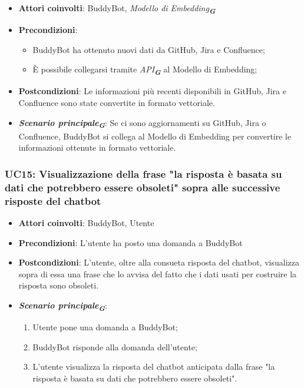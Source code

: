 \begin{itemize}
    \item \textbf{Attori coinvolti}: BuddyBot, \emph{Modello di Embedding}\textsubscript{\textbf{\textit{G}}}
    \item \textbf{Precondizioni}: 
    \begin{itemize}
        \item BuddyBot ha ottenuto nuovi dati da GitHub, Jira e Confluence;
        \item È possibile collegarsi tramite \emph{API}\textsubscript{\textbf{\textit{G}}} al Modello di Embedding;
    \end{itemize}
    \item \textbf{Postcondizioni}: Le informazioni più recenti disponibili in GitHub, Jira e Confluence sono state convertite in formato vettoriale.
    \item \textbf{\emph{Scenario principale}\textsubscript{\textbf{\textit{G}}}}: Se ci sono aggiornamenti su GitHub, Jira o Confluence, BuddyBot si collega al Modello di Embedding per convertire le informazioni 
        ottenute in formato vettoriale.
\end{itemize}



\hypertarget{UC15}{}
\subsubsection{UC15: Visualizzazione della frase "la risposta è basata su dati che potrebbero essere obsoleti" sopra alle successive risposte del chatbot}

\begin{itemize}
    \item \textbf{Attori coinvolti}: BuddyBot, Utente
    \item \textbf{Precondizioni}: L'utente ha posto una domanda a BuddyBot
    \item \textbf{Postcondizioni}: L'utente, oltre alla consueta risposta del chatbot, visualizza sopra di essa una frase che lo avvisa del fatto che i dati usati per 
    costruire la risposta sono obsoleti.
    \item \textbf{\emph{Scenario principale}\textsubscript{\textbf{\textit{G}}}}:
    \begin{enumerate}
        \item Utente pone una domanda a BuddyBot;
        \item BuddyBot risponde alla domanda dell'utente;
        \item L'utente visualizza la risposta del chatbot anticipata dalla frase "la risposta è basata su dati che potrebbero essere obsoleti".
    \end{enumerate}
\end{itemize}